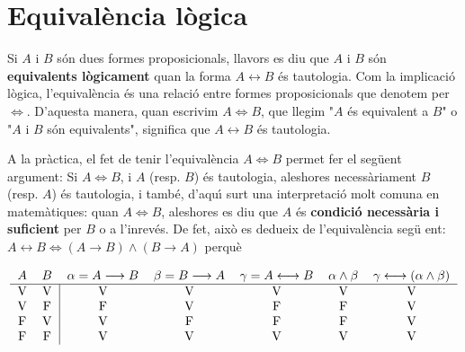 \section{Equival\`{e}ncia l\`{o}gica\label{sec:equivalencia-logica}}

Si $A$ i $B$ s\'{o}n dues formes proposicionals, llavors es diu que $A$ i $B$
s\'{o}n \textbf{equivalents l\`{o}gicament }quan la forma $%
A\longleftrightarrow B$ \'{e}s tautologia. Com la implicaci\'{o} l\`{o}gica,
l'equival\`{e}ncia \'{e}s una relaci\'{o} entre formes proposicionals que
denotem per $\Longleftrightarrow$. D'aquesta manera, quan escrivim $%
A\Longleftrightarrow B$, que llegim "$A$ \'{e}s equivalent a $B$" o "$A$ i $%
B $ s\'{o}n equivalents", significa que $A\longleftrightarrow B$ \'{e}s
tautologia.

A la pr\`{a}ctica, el fet de tenir l'equival\`{e}ncia $A\Longleftrightarrow
B $ permet fer el seg\"{u}ent argument: Si $A\Longleftrightarrow B$, i $A$
(resp. $B$) \'{e}s tautologia, aleshores necess\`{a}riament $B$ (resp. $A$)
\'{e}s tautologia, i tamb\'{e}, d'aqu\'{\i} surt una interpretaci\'{o} molt
comuna en matem\`{a}tiques: quan $A\Longleftrightarrow B$, aleshores es diu
que $A$ \'{e}s \textbf{condici\'{o} necess\`{a}ria i suficient} per $B$ o a
l'inrev\'{e}s. De fet, aix\`{o} es dedueix de l'equival\`{e}ncia seg\"{u}%
ent: $A\longleftrightarrow B\Longleftrightarrow\left( A\longrightarrow
B\right) \wedge\left( B\longrightarrow A\right) $ perqu\`{e}

\begin{equation*}
\begin{tabular}{lllllll}
$A$ & $B$ & $\alpha=A\longrightarrow B$ & $\beta=B\longrightarrow A$ & $%
\gamma=A\longleftrightarrow B$ & $\alpha\wedge\beta$ & $\gamma
\longleftrightarrow\left( \alpha\wedge\beta\right) $ \\ \hline
\multicolumn{1}{c}{V} & \multicolumn{1}{c|}{V} & \multicolumn{1}{c}{V} &
\multicolumn{1}{c}{V} & \multicolumn{1}{c}{V} & \multicolumn{1}{c}{V} &
\multicolumn{1}{c}{V} \\
\multicolumn{1}{c}{V} & \multicolumn{1}{c|}{F} & \multicolumn{1}{c}{F} &
\multicolumn{1}{c}{V} & \multicolumn{1}{c}{F} & \multicolumn{1}{c}{F} &
\multicolumn{1}{c}{V} \\
\multicolumn{1}{c}{F} & \multicolumn{1}{c|}{V} & \multicolumn{1}{c}{V} &
\multicolumn{1}{c}{F} & \multicolumn{1}{c}{F} & \multicolumn{1}{c}{F} &
\multicolumn{1}{c}{V} \\
\multicolumn{1}{c}{F} & \multicolumn{1}{c|}{F} & \multicolumn{1}{c}{V} &
\multicolumn{1}{c}{V} & \multicolumn{1}{c}{V} & \multicolumn{1}{c}{V} &
\multicolumn{1}{c}{V}%
\end{tabular}
\end{equation*}


